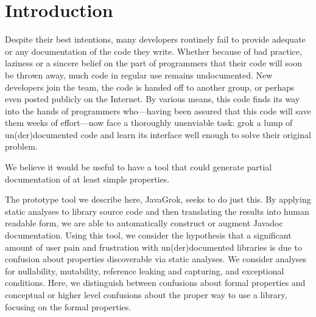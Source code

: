 \section{Introduction}

Despite their best intentions, many developers routinely fail to provide
adequate or any documentation of the code they write.  Whether because of bad
practice, laziness or a sincere belief on the part of programmers that their
code will soon be thrown away, much code in regular use remains undocumented.
New developers join the team, the code is handed off to another group, or
perhaps even posted publicly on the Internet.  By various means, this code
finds its way into the hands of programmers who---having been assured that this
code will save them weeks of effort---now face a thoroughly unenviable task:
grok a lump of un(der)documented code and learn its interface well enough
to solve their original problem.


We believe it would be useful to have a tool that could generate partial
documentation of at least simple properties.

The prototype tool we describe here, JavaGrok, seeks to do just this.  By
applying static analyses to library source code and then
translating the results into human readable form, we are able to
automatically construct or augment Javadoc documentation.
Using this tool, we
consider the hypothesis that a significant amount of user pain and frustration
with un(der)documented libraries is due to confusion about
properties discoverable via static analyses. We consider analyses for nullability, mutability,
reference leaking and capturing, and exceptional conditions.
Here, we distinguish between confusions about formal properties
and conceptual
or higher level confusions about the proper way to use a library, focusing on
the formal properties.

